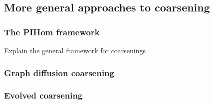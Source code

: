 \subsection{More general approaches to coarsening}\label{sec:coarsening-algorithms}

\subsubsection{The PIHom framework}
Explain the general framework for coarsenings

\subsubsection{Graph diffusion coarsening}

\subsubsection{Evolved coarsening}
